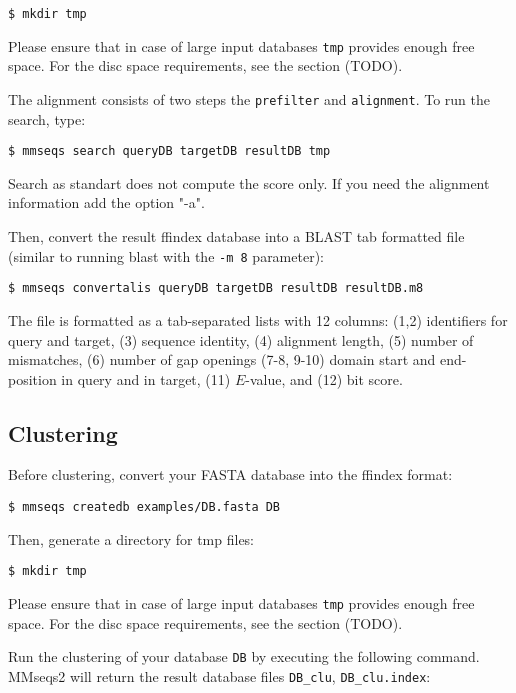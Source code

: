\documentclass[11pt,a4paper]{scrreprt}
\begin{document}
\begin{verbatim}
$ mkdir tmp
\end{verbatim}


Please ensure that in case of large input databases \texttt{tmp} provides enough free space. For the disc space requirements, see the section (TODO).


The alignment consists of two steps the \texttt{prefilter} and \texttt{alignment}. To run the search, type:


\begin{verbatim}
$ mmseqs search queryDB targetDB resultDB tmp
\end{verbatim}
Search as standart does not compute the score only. If you need the alignment information add the option "-a". 


Then, convert the result ffindex database into a BLAST tab formatted file (similar to running blast with the \texttt{-m 8} parameter):


\begin{verbatim}
$ mmseqs convertalis queryDB targetDB resultDB resultDB.m8
\end{verbatim}


The file is formatted as a tab-separated lists with 12 columns: (1,2) identifiers for query and target, (3) sequence identity, (4) alignment length, (5) number of mismatches, (6) number of gap openings (7-8, 9-10) domain start and end-position in query and in target, (11) $E$-value, and (12) bit score.
\subsection*{Clustering}
Before clustering, convert your FASTA database into the ffindex format:


\begin{verbatim}
$ mmseqs createdb examples/DB.fasta DB
\end{verbatim}


Then, generate a directory for tmp files:


\begin{verbatim}
$ mkdir tmp
\end{verbatim}


Please ensure that in case of large input databases \texttt{tmp} provides enough free space. For the disc space requirements, see the section (TODO).


Run the clustering of your database \texttt{DB} by executing the following command. MMseqs2 will return the result database files \texttt{DB\_clu}, \texttt{DB\_clu.index}:
\end{document}
